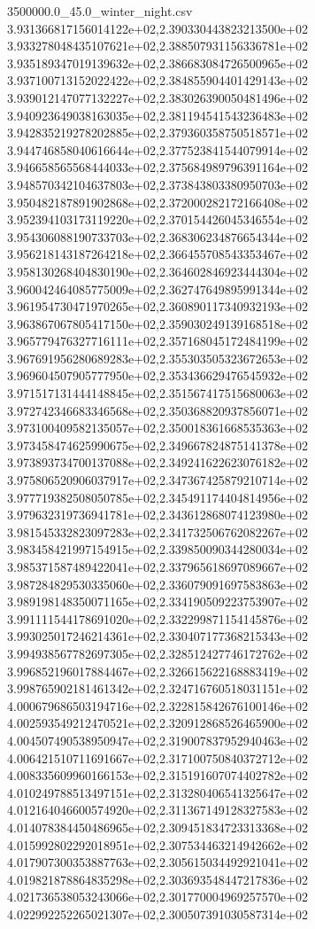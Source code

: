 \begin{filecontents*}{3500000.0_45.0_winter_night.csv}
3.931366817156014122e+02,2.390330443823213500e+02
3.933278048435107621e+02,2.388507931156336781e+02
3.935189347019139632e+02,2.386683084726500965e+02
3.937100713152022422e+02,2.384855904401429143e+02
3.939012147077132227e+02,2.383026390050481496e+02
3.940923649038163035e+02,2.381194541543236483e+02
3.942835219278202885e+02,2.379360358750518571e+02
3.944746858040616644e+02,2.377523841544079914e+02
3.946658565568444033e+02,2.375684989796391164e+02
3.948570342104637803e+02,2.373843803380950703e+02
3.950482187891902868e+02,2.372000282172166408e+02
3.952394103173119220e+02,2.370154426045346554e+02
3.954306088190733703e+02,2.368306234876654344e+02
3.956218143187264218e+02,2.366455708543353467e+02
3.958130268404830190e+02,2.364602846923444304e+02
3.960042464085775009e+02,2.362747649895991344e+02
3.961954730471970265e+02,2.360890117340932193e+02
3.963867067805417150e+02,2.359030249139168518e+02
3.965779476327716111e+02,2.357168045172484199e+02
3.967691956280689283e+02,2.355303505323672653e+02
3.969604507905777950e+02,2.353436629476545932e+02
3.971517131444148845e+02,2.351567417515680063e+02
3.972742346683346568e+02,2.350368820937856071e+02
3.973100409582135057e+02,2.350018361668535363e+02
3.973458474625990675e+02,2.349667824875141378e+02
3.973893734700137088e+02,2.349241622623076182e+02
3.975806520906037917e+02,2.347367425879210714e+02
3.977719382508050785e+02,2.345491174404814956e+02
3.979632319736941781e+02,2.343612868074123980e+02
3.981545332823097283e+02,2.341732506762082267e+02
3.983458421997154915e+02,2.339850090344280034e+02
3.985371587489422041e+02,2.337965618697089667e+02
3.987284829530335060e+02,2.336079091697583863e+02
3.989198148350071165e+02,2.334190509223753907e+02
3.991111544178691020e+02,2.332299871154145876e+02
3.993025017246214361e+02,2.330407177368215343e+02
3.994938567782697305e+02,2.328512427746172762e+02
3.996852196017884467e+02,2.326615622168883419e+02
3.998765902181461342e+02,2.324716760518031151e+02
4.000679686503194716e+02,2.322815842676100146e+02
4.002593549212470521e+02,2.320912868526465900e+02
4.004507490538950947e+02,2.319007837952940463e+02
4.006421510711691667e+02,2.317100750840372712e+02
4.008335609960166153e+02,2.315191607074402782e+02
4.010249788513497151e+02,2.313280406541325647e+02
4.012164046600574920e+02,2.311367149128327583e+02
4.014078384450486965e+02,2.309451834723313368e+02
4.015992802292018951e+02,2.307534463214942662e+02
4.017907300353887763e+02,2.305615034492921041e+02
4.019821878864835298e+02,2.303693548447217836e+02
4.021736538053243066e+02,2.301770004969257570e+02
4.022992252265021307e+02,2.300507391030587314e+02

\end{filecontents*}

